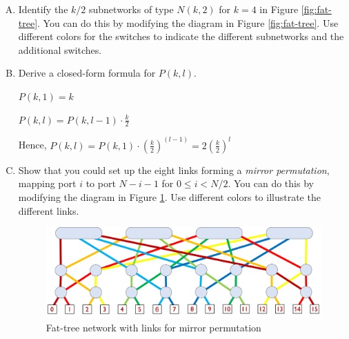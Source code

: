\documentclass[11pt]{article}
\newenvironment{choice}{\begin{enumerate}[A.]}{\end{enumerate}}
\newenvironment{answer}{\begin{minipage}[c][2in]{\textwidth}}{\end{minipage}}
\begin{document}
\begin{choice}
\item
Identify the $k/2$ subnetworks of type $N(k, 2)$ for $k = 4$ in Figure \ref{fig:fat-tree}.
You can do this by modifying the diagram
in Figure \ref{fig:fat-tree}.   Use different colors for the switches
to indicate the different subnetworks and the additional
switches.

\item
Derive a closed-form formula for $P(k, l)$.

\begin{answer}

$P(k,1)=k$

$P(k,l)=P(k,l-1) \cdot \frac{k}{2}$

Hence, $P(k, l)=P(k,1) \cdot (\frac{k}{2})^{(l-1)}=2(\frac{k}{2})^l$

\end{answer}

\item
Show that you could set up the eight links
forming a {\em mirror permutation}, mapping port $i$ to port $N-i-1$ for $0 \leq i < N/2$.
You can do this by modifying the diagram
in Figure \ref{fig:fat-tree-mirror}.  Use different colors to illustrate the different links.

\begin{landscape}
\begin{figure}
\begin{center}
\includegraphics[width=9in]{figs/fat-tree-links.pdf} %
\end{center}
\caption{Fat-tree network with links for mirror permutation}
\label{fig:fat-tree-mirror}
\end{figure}
\end{landscape}
\end{choice}
\end{document}
